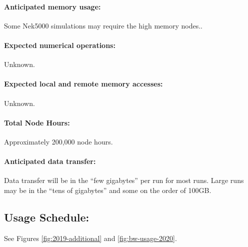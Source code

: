 \documentclass[letterpaper]{article}
\begin{document}
\paragraph{Anticipated memory usage:} Some Nek5000 simulations may require the 
high memory nodes..
\paragraph{Expected numerical operations:} Unknown.
\paragraph{Expected local and remote memory accesses:} Unknown. 
\paragraph{Total Node Hours:} Approximately 200,000 node hours.
\paragraph{Anticipated data transfer:} Data transfer will be in the ``few 
gigabytes'' per run for most runs. Large runs may be in the ``tens of 
gigabytes'' and some on the order of 100GB.





\subsection{Usage Schedule:} See Figures \ref{fig:2019-additional} and 
\ref{fig:bw-usage-2020}.
\end{document}
